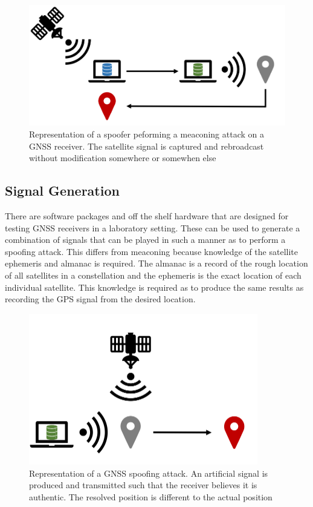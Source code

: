 \begin{figure}[h]
    \begin{centering}
        \includegraphics[width=12cm, keepaspectratio]{Figures/Meaconing.png}
        \caption{Representation of a spoofer peforming a meaconing attack on a GNSS receiver. The satellite signal is captured and rebroadcast without modification somewhere or somewhen else}
    \label{fig:meaconing cartoon}
    \end{centering}
\end{figure}

\subsection{Signal Generation}
There are software packages and off the shelf hardware that are designed for testing GNSS receivers in a laboratory setting. These can be used to generate a combination
of signals that can be
played in such a manner as to perform a spoofing attack. This differs from meaconing because knowledge of the satellite ephemeris and almanac is required. The almanac is
a record of the rough location of all satellites in a constellation and the ephemeris is the exact location of each individual satellite. This knowledge is required as to
produce the same results as recording the GPS signal from the desired location.

\begin{figure}[h]
    \begin{centering}
        \includegraphics[width=10cm, keepaspectratio]{Figures/Spoofing.png}
        \caption{Representation of a GNSS spoofing attack. An artificial signal is produced and transmitted such that the receiver believes it is authentic. The resolved position is different to the actual position}
    \label{fig:spoofing cartoon}
    \end{centering}
\end{figure}

